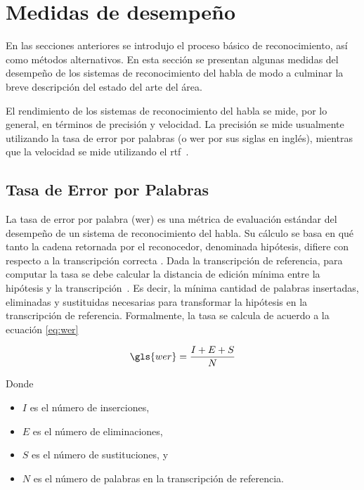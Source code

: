 \section{Medidas de desempe\~no}
\label{sec:medidas-desempenho}

En las secciones anteriores se introdujo el proceso b\'asico de reconocimiento, as\'i como m\'etodos
alternativos. En esta secci\'on se presentan algunas medidas del desempe\~no 
de los sistemas de reconocimiento del habla de modo a culminar la breve descripci\'on del estado del arte del \'area.

El rendimiento de los sistemas de reconocimiento del habla se mide, por lo general, en t\'erminos
de precisi\'on y velocidad. La precisi\'on se mide usualmente utilizando la tasa de error por palabras
(o \gls{wer} por sus siglas en ingl\'es), mientras que la velocidad se mide utilizando el 
\mbox{\gls{rtf} \cite{GaikwadAReview2010}.}

\subsection{Tasa de Error por Palabras}
\label{sec:wer}

La tasa de error por palabra (\gls{wer}) es una m\'etrica de evaluaci\'on est\'andar del desempe\~no de un sistema de
reconocimiento del habla. Su c\'alculo se basa en qu\'e tanto la cadena retornada por el reconocedor,
denominada hip\'otesis, difiere con respecto a la transcripci\'on correcta \cite{Jurafsky}. 
Dada la transcripci\'on de referencia, para computar la tasa se debe calcular la distancia de edici\'on m\'inima
entre la hip\'otesis y la \mbox{transcripci\'on \cite{GaikwadAReview2010}}. Es decir, la m\'inima cantidad 
de palabras insertadas, eliminadas y sustituidas necesarias para transformar la hipótesis en la 
transcripción de referencia. Formalmente, la tasa se calcula de acuerdo a la ecuaci\'on \eqref{eq:wer}

\begin{equation}
\label{eq:wer}
    \gls{wer} = \frac{I + E + S}{N} 
\end{equation}

Donde

\begin{itemize}
    \item $I$ es el n\'umero de inserciones,
    \item $E$ es el n\'umero de eliminaciones,
    \item $S$ es el n\'umero de sustituciones, y
    \item $N$ es el n\'umero de palabras en la transcripci\'on de referencia.
\end{itemize}


